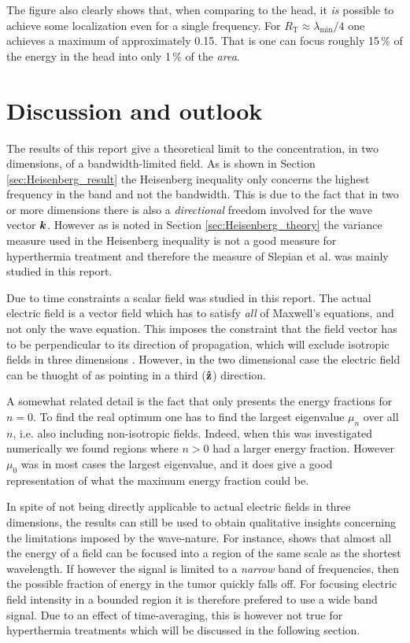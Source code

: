\documentclass[11pt,a4paper, 
swedish,english %
]{article}
\newcommand{\RT}{\ensuremath{R_{\text{T}}}}
\begin{document}
The figure also clearly shows that, when comparing to the head, it
\emph{is} possible to achieve some localization even for a single
frequency. For $\RT \approx \lambda_{\min}/4$ one achieves a maximum
of approximately 0.15. That is one can focus roughly 15\,\% of the
energy in the head into only 1\,\% of the \emph{area}. 



\section{Discussion and outlook}

The results of this report give a theoretical limit to the
concentration, in two dimensions, of a bandwidth-limited field.
As is shown in Section \ref{sec:Heisenberg_result} the Heisenberg 
inequality only concerns the highest frequency in the band and not
the bandwidth. This is due to the fact that in two or more dimensions
there is also a \emph{directional} freedom involved for the wave 
vector $\vb*k$. However as is noted in Section \ref{sec:Heisenberg_theory}
the variance measure used in the Heisenberg inequality is not a 
good measure for hyperthermia treatment and therefore the measure of
Slepian et al. was mainly studied in this report.

Due to time constraints a scalar field was studied in this report.
The actual electric field is a vector field which has to satisfy
\emph{all} of Maxwell's equations, and not only the wave
equation. This imposes the constraint that the field vector has to be
perpendicular to its direction of propagation, which will exclude
isotropic fields in three dimensions \cite{Jackson}.
However, in the two dimensional case the electric field can be thuoght
of as pointing in a third ($\vu{z}$) direction.

A somewhat related detail is the fact that  only
presents the energy fractions for $n=0$. To find the
real optimum one has to find the largest eigenvalue $\mu_n$ over all
$n$, i.e. also including non-isotropic fields. Indeed, when this was investigated
numerically we found regions where $n>0$ had a larger energy
fraction. However $\mu_0$ was in most cases the largest eigenvalue,
and it does give a good representation of what the maximum 
energy fraction could be. 

In spite of not being directly applicable to actual electric fields in
three dimensions,
the results can still be used to obtain 
qualitative insights concerning the limitations imposed by the
wave-nature. For instance,  shows that almost all the
energy of a field can be focused into a region of the same scale as
the shortest wavelength. If however the signal is limited to a
\emph{narrow} band of frequencies, then the possible fraction of
energy in the tumor quickly falls off. 
For focusing electric field intensity in
a bounded region it is therefore prefered to use a wide band
signal. Due to an effect of time-averaging, this is however not true for
hyperthermia treatments which will be discussed in the following
section. 
\end{document}

